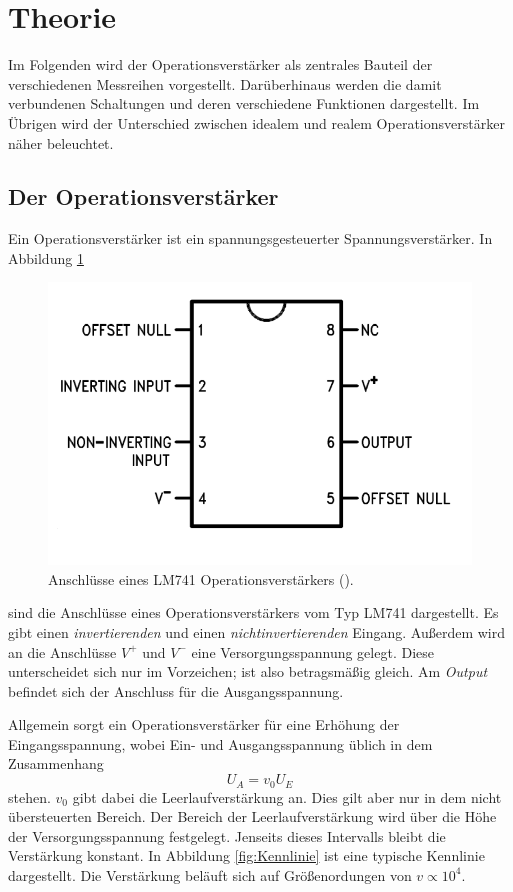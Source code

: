 \section{Theorie}
\label{sec:Theorie}


Im Folgenden wird der Operationsverstärker als zentrales Bauteil der verschiedenen Messreihen vorgestellt.
Darüberhinaus werden die damit verbundenen Schaltungen und deren verschiedene Funktionen dargestellt.
Im Übrigen wird der Unterschied zwischen idealem und realem Operationsverstärker näher beleuchtet.

\subsection{Der Operationsverstärker}

Ein Operationsverstärker ist ein spannungsgesteuerter Spannungsverstärker.
In Abbildung \ref{fig:OP}

\begin{figure}
    \centering 
    \includegraphics[width=.5\textwidth]{Bilder/OP.PNG}
    \caption{Anschlüsse eines LM741 Operationsverstärkers (\cite{LM741}).}
    \label{fig:OP}
\end{figure}

sind die Anschlüsse eines Operationsverstärkers vom Typ LM741 dargestellt.
Es gibt einen \textit{invertierenden} und einen \textit{nichtinvertierenden} Eingang.
Außerdem wird an die Anschlüsse $V^+$ und $V^-$ eine Versorgungsspannung gelegt.
Diese unterscheidet sich nur im Vorzeichen; ist also betragsmäßig gleich.
Am \textit{Output} befindet sich der Anschluss für die Ausgangsspannung.



Allgemein sorgt ein Operationsverstärker für eine Erhöhung der Eingangsspannung, wobei Ein- und Ausgangsspannung üblich in dem Zusammenhang
\begin{equation}
    U_A = v_0U_E 
\end{equation}
stehen.
$v_0$ gibt dabei die Leerlaufverstärkung an.
Dies gilt aber nur in dem nicht übersteuerten Bereich.
Der Bereich der Leerlaufverstärkung wird über die Höhe der Versorgungsspannung festgelegt.
Jenseits dieses Intervalls bleibt die Verstärkung konstant.
In Abbildung \ref{fig:Kennlinie} ist eine typische Kennlinie dargestellt.
Die Verstärkung beläuft sich auf Größenordungen von $v \propto 10^4$.


